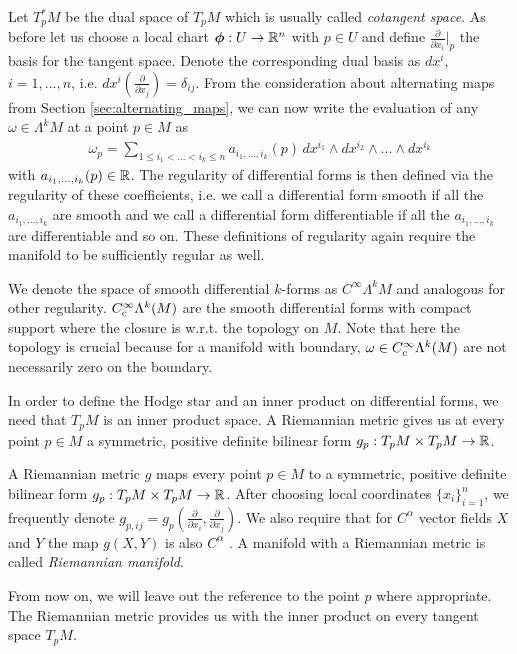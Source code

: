 \documentclass[../master_thesis.tex]{subfiles}
\begin{document}
Let $T_p^* M$ be the dual space of $T_p M$ which is usually called 
\textit{cotangent space}.
As before let us choose a local chart $\boldsymbol{\phi}: U \rightarrow \mathbb{R}^n$ with 
$p \in U$ and define $\frac{\partial}{\partial x_i}|_p$ the basis for the tangent space. 
Denote the corresponding
dual basis as $dx^i$, $i = 1,...,n$, i.e. 
$dx^i(\frac{\partial}{\partial x_j}) = \delta_{ij}$. 
From the consideration about
alternating maps from Section \ref{sec:alternating_maps}, we can now write the evaluation of any 
$\omega \in \Lambda^k M$ at a point $p \in M$ as 
\begin{align*}
    \omega_p = \sum\limits_{1\leq i_1 < ... < i_k \leq n} 
        a_{i_1,...,i_k}(p) \,dx^{i_1} \wedge dx^{i_2} \wedge ... \wedge dx^{i_k}
\end{align*}
with $a_{i_1,...,i_k}(p) \in \mathbb{R}$. The regularity of differential forms 
is then defined via the regularity of these coefficients, i.e. we call 
a differential form smooth if all the $a_{i_1,...,i_k}$ are smooth 
and we call a differential form differentiable if all the $a_{i_1,...,i_k}$
are differentiable and so on. These definitions of regularity again require 
the manifold to be sufficiently regular as well.

We denote the 
space of smooth differential $k$-forms as $C^\infty \Lambda^k M$ and analogous for other regularity.
$C_c^\infty \Lambda^{k}(M)$ are the smooth differential forms
with compact support where the closure is w.r.t. 
the topology on $M$. Note that here the topology is crucial because for a manifold with boundary, 
$\omega \in C_c^\infty \Lambda^{k}(M)$ are not necessarily zero on the boundary.

In order to define the Hodge star and an inner product on differential forms,
we need that 
$T_p M$ is an inner product space.
A Riemannian metric gives us at every point $p \in M$ 
a symmetric, positive definite bilinear form 
$g_p: T_p M \times T_p M \rightarrow \mathbb{R}$. 
\begin{definition}
    A Riemannian metric $g$ maps every point $p\in M$ to 
    a symmetric, positive definite bilinear form $g_p: T_p M \times T_p M \rightarrow \mathbb{R}$.
    After choosing local coordinates $\{x_i\}_{i=1}^n$, we frequently denote 
    $g_{p,ij} = g_p(\frac{\partial}{\partial x_i}, \frac{\partial}{\partial x_j})$.
    We also require that for $C^\alpha$ vector fields $X$ and $Y$ the map 
    $g(X,Y)$ is also $C^\alpha$ . 
    A manifold with a Riemannian metric is called 
    \textit{Riemannian manifold}.
\end{definition}
From now on, we will leave out the reference to the point $p$ where appropriate.
The Riemannian metric provides us with the 
inner product on every tangent space $T_p M$. 
\end{document}
